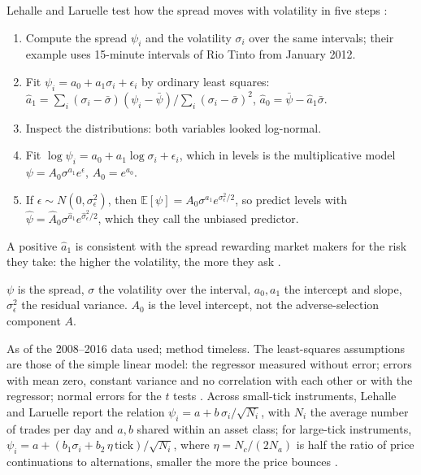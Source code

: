 \begin{qfmethod}\label{meth:spread-volatility-regression}
 Lehalle and Laruelle test how the spread moves with volatility in five steps \citep[sec.~A.10, pp.~292--298]{alpha-laruelle}:
\begin{enumerate}
\item Compute the spread $\psi_i$ and the volatility $\sigma_i$ over the same intervals; their example uses 15-minute intervals of Rio Tinto from January 2012.
\item Fit $\psi_i=a_0+a_1\sigma_i+\epsilon_i$ by ordinary least squares: $\hat a_1=\sum_i(\sigma_i-\bar\sigma)(\psi_i-\bar\psi)/\sum_i(\sigma_i-\bar\sigma)^2$, $\hat a_0=\bar\psi-\hat a_1\bar\sigma$.
\item Inspect the distributions: both variables looked log-normal.
\item Fit $\log\psi_i=a_0+a_1\log\sigma_i+\epsilon_i$, which in levels is the multiplicative model $\psi=A_0\sigma^{a_1}e^{\epsilon}$, $A_0=e^{a_0}$.
\item If $\epsilon\sim N(0,\sigma_\epsilon^2)$, then $\mathbb{E}[\psi]=A_0\sigma^{a_1}e^{\sigma_\epsilon^2/2}$, so predict levels with $\hat\psi=\hat A_0\sigma^{\hat a_1}e^{\hat\sigma_\epsilon^2/2}$, which they call the unbiased predictor.
\end{enumerate}
A positive $\hat a_1$ is consistent with the spread rewarding market makers for the risk they take: the higher the volatility, the more they ask \citep[chap.~2, sec.~2.3.1, p.~150]{alpha-laruelle}.

 $\psi$ is the spread, $\sigma$ the volatility over the interval, $a_0,a_1$ the intercept and slope, $\sigma_\epsilon^2$ the residual variance. $A_0$ is the level intercept, not the adverse-selection component $A$.

 As of the 2008--2016 data used; method timeless. The least-squares assumptions are those of the simple linear model: the regressor measured without error; errors with mean zero, constant variance and no correlation with each other or with the regressor; normal errors for the $t$ tests \citep[app.~A, sec.~A.10.1, pp.~293--295]{alpha-laruelle}. Across small-tick instruments, Lehalle and Laruelle report the relation $\psi_i=a+b\,\sigma_i/\sqrt{N_i}$, with $N_i$ the average number of trades per day and $a,b$ shared within an asset class; for large-tick instruments, $\psi_i=a+(b_1\sigma_i+b_2\,\eta\,\mathrm{tick})/\sqrt{N_i}$, where $\eta=N_c/(2N_a)$ is half the ratio of price continuations to alternations, smaller the more the price bounces \citep[chap.~2, sec.~2.2, pp.~144--145]{alpha-laruelle}.


\end{qfmethod}
